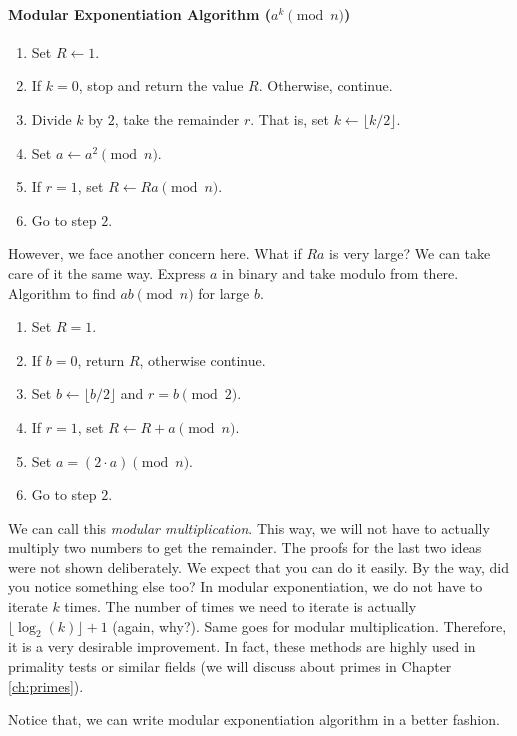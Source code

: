 \documentclass{subfile}
\begin{document}
	\paragraph{Modular Exponentiation Algorithm ($a^k\pmod n$)}
		\begin{enumerate}[1.]
			\item Set $R \longleftarrow 1$.
			\item If $k=0$, stop and return the value $R$. Otherwise, continue.\label{alg:stopme}
			\item Divide $k$ by $2$, take the remainder $r$. That is, set $k\longleftarrow \lfloor k/2\rfloor$.
			\item Set $a\longleftarrow a^2\pmod n$.
			\item If $r=1$, set $R\longleftarrow Ra\pmod n$.
			\item Go to step $2$.
		\end{enumerate}
	However, we face another concern here. What if $Ra$ is very large? We can take care of it the same way. Express $a$ in binary and take modulo from there. Algorithm to find $ab\pmod n$ for large $b$.
		\begin{enumerate}[1.]
			\item Set $R=1$.
			\item If $b=0$, return $R$, otherwise continue.
			\item Set $b\longleftarrow \lfloor b/2\rfloor$ and $r=b\pmod2$.
			\item If $r=1$, set $R\longleftarrow R+a\pmod n$.
			\item Set $a = (2\cdot a)\pmod n$.
			\item Go to step $2$.
		\end{enumerate}
	We can call this \textit{modular multiplication}. This way, we will not have to actually multiply two numbers to get the remainder. The proofs for the last two ideas were not shown deliberately. We expect that you can do it easily. By the way, did you notice something else too? In modular exponentiation, we do not have to iterate $k$ times. The number of times we need to iterate is actually $\lfloor \log_2(k)\rfloor+1$ (again, why?). Same goes for modular multiplication. Therefore, it is a very desirable improvement. In fact, these methods are highly used in primality tests or similar fields (we will discuss about primes in Chapter \ref{ch:primes}).
	
	Notice that, we can write modular exponentiation algorithm in a better fashion.
\end{document}
